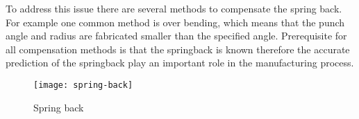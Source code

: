 To address this issue there are several methods to compensate the spring back. For example one common method is over bending, which means that the punch angle and radius are fabricated smaller than the specified angle. 
\cite[p. 114]{groover_fundamentalsmodernmanufacturing_2020}
Prerequisite for all compensation methods is that the springback is known therefore the accurate prediction of the springback play an important role in the manufacturing process.

\begin{figure}[H]
    \centering
    \texttt{[image: spring-back]}
    \caption{Spring back \cite[p. ]{cruz_applicationmachinelearning_2021}}
    \label{fig:spring-back}
\end{figure}




